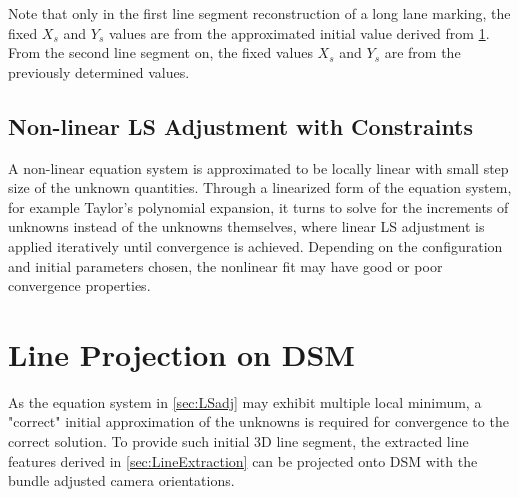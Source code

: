 Note that only in the first line segment reconstruction of a long lane marking, the fixed $X_s$ and $Y_s$ values are from the approximated initial value derived from \cref{sec:LineProjectionOnDSM}. From the second line segment on, the fixed values $X_s$ and $Y_s$ are from the previously determined values.


\subsection{Non-linear LS Adjustment with Constraints}
\label{subsec:LSadj}

A non-linear equation system is approximated to be locally linear with small step size of the unknown quantities. Through a linearized form of the equation system, for example Taylor's polynomial expansion, it turns to solve for the increments of unknowns instead of the unknowns themselves, where linear LS adjustment is applied iteratively until convergence is achieved. Depending on the configuration and initial parameters chosen, the nonlinear fit may have good or poor convergence properties.














\section{Line Projection on DSM}
\label{sec:LineProjectionOnDSM}

As the equation system in \cref{sec:LSadj} may exhibit multiple local minimum, a "correct" initial approximation of the unknowns is required for convergence to the correct solution. To provide such initial 3D line segment, the extracted line features derived in \cref{sec:LineExtraction} can be projected onto DSM with the bundle adjusted camera orientations.

